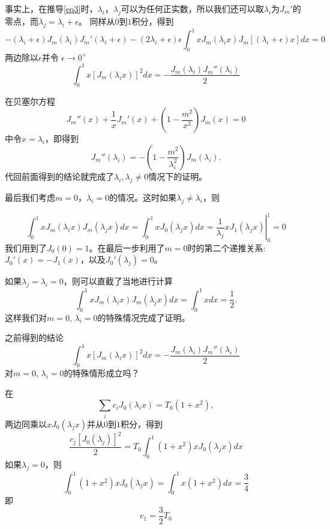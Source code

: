 \documentclass[CJK]{beamer}
\begin{document}
\begin{frame}
  \bch
  事实上，在推导\eqref{eq3}时，$\lambda_i$，$\lambda_j$可以为任何正实数，所以我们还可以取$\lambda_i$为$J_m'$的零点，而$\lambda_j = \lambda_i +\epsilon$。
    同样从$0$到$1$积分，得到
    $$ -(\lambda_i+\epsilon)J_m(\lambda_i) J_m'(\lambda_i+\epsilon)  -(2\lambda_i+\epsilon)\epsilon\int_0^1xJ_m(\lambda_ix)J_m[(\lambda_i+\epsilon)x]dx = 0 $$
    两边除以$\epsilon$并令 $\epsilon\rightarrow 0^+$
    $$ \int_0^1x\left[J_m(\lambda_ix)\right]^2dx = -\frac{J_m(\lambda_i)J_m''(\lambda_i)}{2} $$
    
  \ech
\end{frame}

\begin{frame}
  \bch
  在贝塞尔方程
  $$J_m''(x) + \frac{1}{x}J_m'(x) + \left(1-\frac{m^2}{x^2}\right)J_m(x) = 0$$
  中令$x = \lambda_i$，即得到
  $$J_m''(\lambda_i) = - \left(1-\frac{m^2}{\lambda_i^2}\right)J_m(\lambda_i).$$
  代回前面得到的结论就完成了$\lambda_i,\lambda_j \ne 0$情况下的证明。
  \ech
\end{frame}


\begin{frame}
  \bch
  最后我们考虑$m=0$，$\lambda_i=0$的情况。这时如果$\lambda_j\ne \lambda_i$，则
  

$$  \int_0^1 xJ_m(\lambda_ix)J_m(\lambda_jx) dx = \int_0^1xJ_0(\lambda_j x) dx
 = \left. \frac{1}{\lambda_j} xJ_1(\lambda_j x) \right\vert_0^1 =0 $$
我们用到了$J_0(0)=1$。在最后一步利用了$m=0$时的第二个递推关系: $J_0'(x) = - J_1(x)$，以及$J_0'(\lambda_j)=0$。

\skipline

  如果$\lambda_j=\lambda_i=0$，则可以直截了当地进行计算
  $$  \int_0^1 xJ_m(\lambda_ix)J_m(\lambda_jx) dx = \int_0^1 x dx  = \frac{1}{2} .$$
  这样我们对$m=0$, $\lambda_i=0$的特殊情况完成了证明。
  \ech
\end{frame}


\begin{frame}
  \bch
  
  之前得到的结论
  $$ \int_0^1x\left[J_m(\lambda_ix)\right]^2dx = -\frac{J_m(\lambda_i)J_m''(\lambda_i)}{2} $$
  对$m=0$, $\lambda_i=0$的特殊情形成立吗？
  
  \ech
\end{frame}

\begin{frame}
  \bch
  在
  $$ \sum_i c_iJ_0\left(\lambda_i x\right) = T_0\left(1+x^2\right), $$
  两边同乘以$xJ_0(\lambda_j x)$并从$0$到$1$积分，得到
  $$ \frac{c_j\left[J_0(\lambda_j)\right]^2}{2} = T_0 \int_0^1(1+x^2)xJ_0(\lambda_jx)dx $$
  如果$\lambda_j =0$，则
  $$\int_0^1(1+x^2)xJ_0(\lambda_j x) = \int_0^1x(1+x^2)dx  =\frac{3}{4}$$
  即
  $$c_1 = \frac{3}{2}T_0$$
  \ech
\end{frame}
\end{document}
